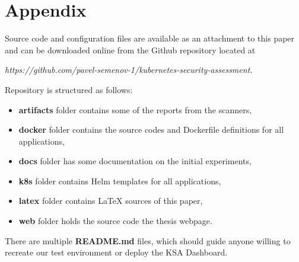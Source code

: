 \chapter*{Appendix}
\label{chap:appendix}

Source code and configuration files are available as an attachment to this paper and can be downloaded online from the Github repository located at 
\begin{center}
    \textit{https://github.com/pavel-semenov-1/kubernetes-security-assessment.}
\end{center}

Repository is structured as follows:
\begin{itemize}[noitemsep,nosep]
    \item \textbf{artifacts} folder contains some of the reports from the scanners,
    \item \textbf{docker} folder contains the source codes and Dockerfile definitions for all applications,
    \item \textbf{docs} folder has some documentation on the initial experiments,
    \item \textbf{k8s} folder contains Helm templates for all applications,
    \item \textbf{latex} folder contains \LaTeX{} sources of this paper,
    \item \textbf{web} folder holds the source code the thesis webpage.
\end{itemize}

There are multiple \textbf{README.md} files, which should guide anyone willing to recreate our test environment or deploy the KSA Dashboard.